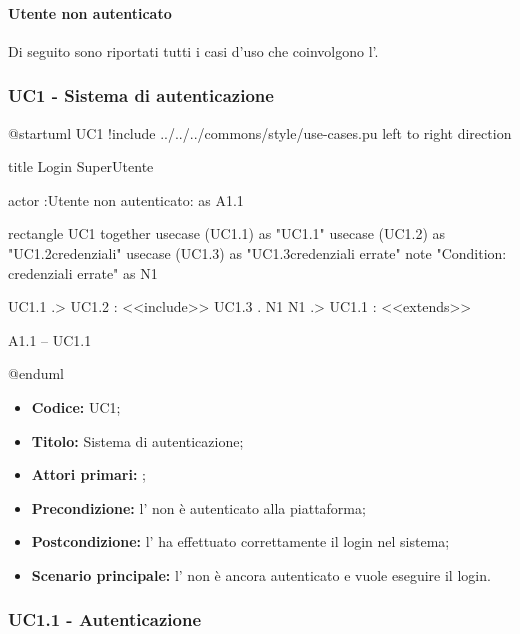 \documentclass[casi-duso]{subfiles}
\begin{document}
\paragraph{Utente non autenticato}
\label{par:utente-non-autenticato}
Di seguito sono riportati tutti i casi d'uso che coinvolgono l'.

\subsubsection{UC1 - Sistema di autenticazione}
\label{subsub:UC1}


\begin{plantuml}
  @startuml UC1
  !include ../../../commons/style/use-cases.pu
  left to right direction

  title Login SuperUtente

  actor :Utente non autenticato: as A1.1

  rectangle UC1{
      together {
          usecase (UC1.1) as "UC1.1\nAutenticazione"
          usecase (UC1.2) as "UC1.2\nVerifica credenziali"
          usecase (UC1.3) as "UC1.3\nVisualizzazione credenziali errate"
          note "Condition: credenziali errate" as N1
        }
    }

  UC1.1 .> UC1.2 : <<include>>
  UC1.3 . N1
  N1 .> UC1.1 : <<extends>>

  A1.1 -- UC1.1


  @enduml
\end{plantuml}


\begin{itemize}
  \item \textbf{Codice:} UC1;
  \item \textbf{Titolo:} Sistema di autenticazione;
  \item \textbf{Attori primari:} ;
  \item \textbf{Precondizione:} l' non è autenticato alla piattaforma;
  \item \textbf{Postcondizione:} l' ha effettuato correttamente il login nel sistema;
  \item \textbf{Scenario principale:} l' non è ancora autenticato e vuole eseguire il login.
\end{itemize}
\subsubsection{UC1.1 - Autenticazione}
\label{subsub:UC1.1}
\end{document}
